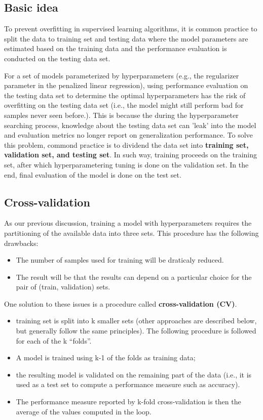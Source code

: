 \begin{refsection}
\subsection{Basic idea}
To prevent overfitting in supervised learning algorithms, it is common practice to split the data to training set and testing data where the model parameters are estimated based on the training data and the performance evaluation is conducted on the testing data set. 

For a set of models parameterized by hyperparameters (e.g., the regularizer parameter in the penalized linear regression), using performance evaluation on the testing data set to determine the optimal hyperparameters has the risk of  overfitting on the testing data set (i.e., the model might still perform bad for samples never seen before.). This is because the during the hyperparameter searching process, knowledge about the testing data set can 'leak' into the model and evaluation metrics no longer report on generalization performance. To solve this problem, commond practice is to dividend the data set into \textbf{training set, validation set, and testing set}. 
In such way, training proceeds on the training set, after which hyperparametering tuning is done on the validation set. In the end, final evaluation of the model is done on the test set.

\subsection{Cross-validation}

As our previous discussion, training a model with hyperparameters requires the partitioning of the available data into three sets. This procedure has the following drawbacks:
\begin{itemize}
	\item The number of samples used for training will be draticaly reduced.
	\item The result will be that the results can depend on a particular choice for the pair of (train, validation) sets.
\end{itemize} 

One solution to these issues is a procedure called \textbf{cross-validation (CV)}. 
\begin{method}
\begin{itemize}
	 \item training set is split into k smaller sets (other approaches are described below, but generally follow the same principles). The following procedure is followed for each of the k “folds”.
	 \item A model is trained using k-1 of the folds as training data;
	 \item the resulting model is validated on the remaining part of the data (i.e., it is used as a test set to compute a performance measure such as accuracy).
	 \item The performance measure reported by k-fold cross-validation is then the average of the values computed in the loop.
\end{itemize}	
\end{method}



\end{refsection}
